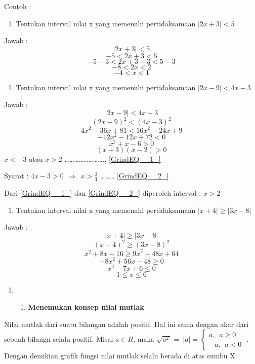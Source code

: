 \documentclass[11pt,fleqn]{book} %
\begin{document}
\noindent 

\noindent Contoh :

\begin{enumerate}
\item  Tentukan interval nilai x yang memenuhi pertidaksamaan $\left|2x+3\right|<5$
\end{enumerate}

\noindent Jawab :
\[\left|2x+3\right|<5\] 
\[-5<2x+3<5\] 
\[-5-3<2x+3-3<5-3\] 
\[-8<2x<2\] 
\[-4<x<1\] 


\begin{enumerate}
\item  Tentukan interval nilai x yang memenuhi pertidaksamaan $\left|2x-9\right|<4x-3$
\end{enumerate}

\noindent Jawab :
\[\left|2x-9\right|<4x-3\] 
\[{\left(2x-9\right)}^2<{\left(4x-3\right)}^2\] 
\[4x^2-36x+81<16x^2-24x+9\] 
\[-12x^2-12x+72<0\] 
\[x^2+x-6>0\] 
\[\left(x+3\right)\left(x-2\right)>0\] 
$x<-3$ atau $x>2$ {\dots}{\dots}{\dots}{\dots}{\dots}{\dots}{\dots}{\dots}.. \eqref{GrindEQ__1_}

\noindent Syarat : $4x-3>0\ \ \Longrightarrow \ \ x>\frac{3}{4}$  {\dots}{\dots}{\dots} \eqref{GrindEQ__2_}

\noindent Dari \eqref{GrindEQ__1_} dan \eqref{GrindEQ__2_} diperoleh interval : $x>2$

\begin{enumerate}
\item  Tentukan interval nilai x yang memenuhi pertidaksamaan $\left|x+4\right|\ge \left|3x-8\right|$
\end{enumerate}

\noindent Jawab :
\[\left|x+4\right|\ge \left|3x-8\right|\] 
\[{\left(x+4\right)}^2\ge {\left(3x-8\right)}^2\] 
\[x^2+8x+16\ge {9x}^2-48x+64\] 
\[{-8x}^2+56x-48\ge 0\] 
\[x^2-7x+6\le 0\] 
\[1\le x\le 6\] 


\noindent 

\begin{enumerate}
\item \begin{enumerate}
\item  \textbf{Menemukan konsep nilai mutlak}
\end{enumerate}
\end{enumerate}

\noindent Nilai mutlak dari suatu bilangan adalah positif. Hal ini sama dengan akar dari sebuah bilangn selalu positif. Misal $a\in R$, maka $\sqrt{a^{2\ }}=\ \left|a\right|=\left\{ \begin{array}{c}
a,\ \ a\ge 0 \\ 
-a,\ \ a<0 \end{array}
\right.$ . Dengan demikian grafik fungsi nilai mutlak selalu berada di atas sumbu X.
\end{document}
